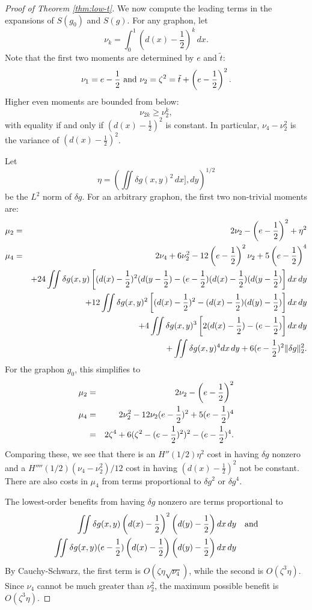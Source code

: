 \documentclass[10pt,a4paper]{amsart}
\begin{document}
\begin{proof}[Proof of Theorem \ref{thm:low-t}]
\smallskip

 We now compute the leading terms in the expansions of $S(g_0)$ and $S(g)$. For any graphon, 
let 
\begin{equation}
\nu_k = \int_0^1 \left (d(x) - \frac12 \right)^k \, dx. 
\end{equation}
Note that the first two moments are determined by $e$ and $\tilde t$:
\begin{equation} \nu_1= e - \frac12 \hbox{ and } \nu_2 = \zeta^2 = \tilde t + \left ( e - \frac12 \right )^2. 
\end{equation} 
Higher even moments are bounded from below: 
\begin{equation} 
\nu_{2k} \ge \nu_2^k,
\end{equation}
with equality if and only if $\left( d(x)-\frac12 \right )^2$ is constant. In particular, $\nu_4-\nu_2^2$ is the variance of 
 $\left( d(x)-\frac12 \right )^2$.

 Let 
 \[ \eta = \left ( \iint \delta g(x,y)^2 \, dx], dy \right )^{1/2} \]
 be the $L^2$ norm of $\delta g$. For an arbitrary graphon, the first two non-trivial moments are:
 \begin{eqnarray}
 \mu_2 & = & 2 \nu_2 - \left ( e - \frac12\right )^2 + \eta^2 \cr 
 \mu_4 & = & 2 \nu_4 +  6\nu_2^2 - 12 \left (e-\frac12\right)^2 \nu_2 + 5\left (e-\frac12\right)^4 \cr 
 && + 24 \iint \delta g(x,y) \left [ (d(x)-\frac12)^2(d(y-\frac12)- (e-\frac12) (d(x)-\frac12)(d(y-\frac12)\right ]   dx \, dy \cr 
 && + 12 \iint \delta g(x,y)^2 \left [ (d(x)-\frac12)^2- (d(x)-\frac12)(d(y)-\frac12)\right ]   dx \, dy \cr
  && + 4 \iint \delta g(x,y)^3 \left [ 2(d(x)-\frac12)- (e-\frac12) \right ]   dx \, dy \cr
  && + \iint \delta g(x,y)^4  dx \, dy + 6 (e-\frac12)^2 \|\delta g\|_2^2. 
 \end{eqnarray}
 For the graphon $g_0$, this simplifies to 
  \begin{eqnarray}
 \mu_2 & = & 2 \nu_2 - \left ( e - \frac12\right )^2  \cr 
 \mu_4 & = & 2 \nu_2^2 -12 \nu_2 (e-\frac12)^2 + 5(e-\frac12)^4 \cr 
 & = & 2\zeta^4 + 6 (\zeta^2 - (e-\frac12)^2)^2 - (e-\frac12)^4. 
 \end{eqnarray}
Comparing these, we see that there is an $H''(1/2)\eta^2$ cost in having $\delta g$ nonzero and a $H''''(1/2) (\nu_4-\nu_2^2)/12$ 
cost in having $(d(x) - \frac12)^2$ not be constant. There are also costs in $\mu_4$ from terms proportional to $\delta g^2$ or $\delta g^4$. 

The lowest-order benefits from having $\delta g$ nonzero are terms proportional to 
\begin{eqnarray}
\iint \delta g(x,y) \left (d(x)-\frac12 \right )^2\left ( d(y)-\frac12 \right ) dx\, dy &&  \hbox{and} \cr 
\iint \delta g(x,y) (e - \frac12) \left (d(x)-\frac12 \right )\left ( d(y)-\frac12 \right ) dx\, dy && \end{eqnarray}
By Cauchy-Schwarz, the first term is $O(\zeta \eta \sqrt{\nu_4})$, while the second 
is $O(\zeta^3\eta)$. 
Since $\nu_4$ cannot be much greater than $\nu_2^2$, the maximum possible 
benefit is $O(\zeta^3\eta)$. 


\end{proof}
\end{document}
